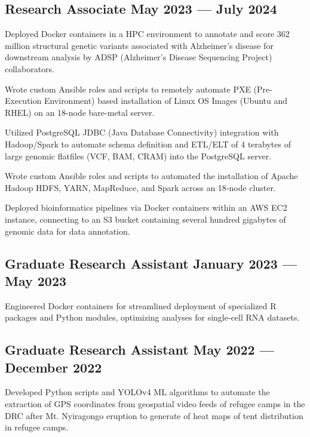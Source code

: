 \subsection{{Research Associate \hfill May 2023 --- July 2024}}
\begin{zitemize}
\item Deployed Docker containers in a HPC environment to annotate and score 362 million structural genetic variants associated with Alzheimer's disease for downstream analysis by ADSP (Alzheimer's Disease Sequencing Project) collaborators.
\item Wrote custom Ansible roles and scripts to remotely automate PXE (Pre-Execution Environment) based installation of Linux OS Images (Ubuntu and RHEL) on an 18-node bare-metal server.
\item  Utilized PostgreSQL JDBC (Java Database Connectivity) integration with Hadoop/Spark to automate schema definition and ETL/ELT of 4 terabytes of large genomic flatfiles (VCF, BAM, CRAM) into the PostgreSQL server.
\item Wrote custom Ansible roles and scripts to automated the installation of Apache Hadoop HDFS, YARN, MapReduce, and Spark across an 18‑node cluster.
\item Deployed bioinformatics pipelines via Docker containers within an AWS EC2 instance, connecting to an S3 bucket containing several hundred gigabytes of genomic data for data annotation.
\end{zitemize}

\subsection{{Graduate Research Assistant \hfill January 2023 --- May 2023}}
\begin{zitemize}
\item Engineered Docker containers for streamlined deployment of specialized R packages and Python modules, optimizing analyses for single‑cell RNA datasets.
\end{zitemize}

\subsection{{Graduate Research Assistant \hfill May 2022 --- December 2022}}
\begin{zitemize}
\item Developed Python scripts and YOLOv4 ML algorithms to automate the extraction of GPS coordinates from geospatial video feeds of refugee camps in the DRC after Mt. Nyiragongo eruption to generate of heat maps of tent distribution in refugee camps.
\end{zitemize}

